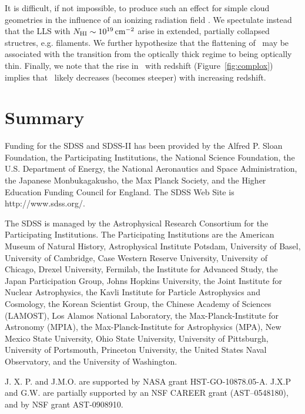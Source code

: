 \documentclass[12pt,preprint]{aastex}
\begin{document}
It is difficult, if not impossible, to produce such an effect
for simple cloud geometries in the influence of an ionizing
radiation field \citep{zm0?}.
We spectulate instead that the LLS with $N_{\rm HI} \sim 10^{19} \, {\rm cm^{-2}}$
arise in extended, partially collapsed structres, e.g. filaments.
We further hypothesize that the flattening of \fnhi\ may be
associated with the transition from
the optically thick regime to being optically thin.
Finally, we note that the rise in \llls\ with redshift
(Figure~\ref{fig:complox}) implies that \btlls\ likely decreases
(becomes steeper) with increasing redshift.



\section{Summary}

\acknowledgments

Funding for the SDSS and SDSS-II has been provided by the Alfred P. Sloan 
Foundation, the Participating Institutions, the National Science Foundation, 
the U.S. Department of Energy, the National Aeronautics and Space 
Administration, the Japanese Monbukagakusho, the Max Planck Society, 
and the Higher Education Funding Council for England. The SDSS Web Site 
is http://www.sdss.org/.

The SDSS is managed by the Astrophysical Research Consortium for the Participating Institutions. The Participating Institutions are the American Museum of Natural History, Astrophysical Institute Potsdam, University of Basel, University of Cambridge, Case Western Reserve University, University of Chicago, Drexel University, Fermilab, the Institute for Advanced Study, the Japan Participation Group, Johns Hopkins University, the Joint Institute for Nuclear Astrophysics, the Kavli Institute for Particle Astrophysics and Cosmology, the Korean Scientist Group, the Chinese Academy of Sciences (LAMOST), Los Alamos National Laboratory, the Max-Planck-Institute for Astronomy (MPIA), the Max-Planck-Institute for Astrophysics (MPA), New Mexico State University, Ohio State University, University of Pittsburgh, University of Portsmouth, Princeton University, the United States Naval Observatory, and the University of Washington.

J. X. P. and J.M.O. are supported by NASA grant
HST-GO-10878.05-A.  J.X.P and G.W. are partially supported
by an NSF CAREER grant (AST--0548180), and 
by NSF grant AST-0908910.

\appendix
\end{document}

